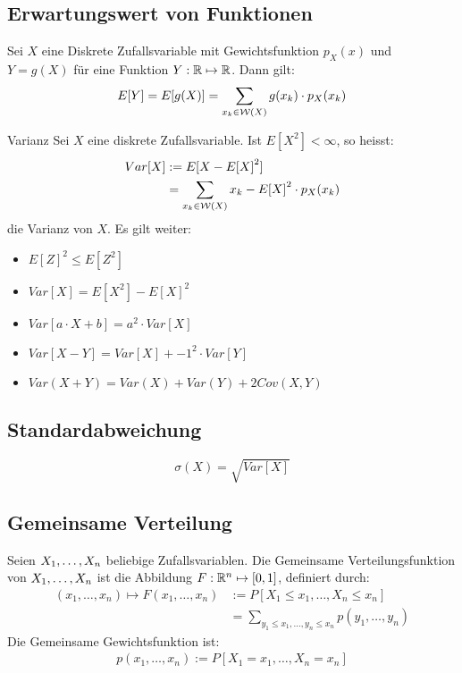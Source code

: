 \subsection{Erwartungswert von Funktionen}
Sei $X$ eine Diskrete Zufallsvariable mit Gewichtsfunktion $p_X (x)$ und $Y = g
  (X)$ für eine Funktion $Y: \mathbb{R} \mapsto \mathbb{R}$. Dann gilt:
\begin{align*}
  E[Y] = E[g (X)] = \sum_{x_k \in \mathcal{W} (X)} g (x_k) \cdot p_X (x_k)
\end{align*}
\begin{definition}{Varianz}
  Sei $X$ eine diskrete Zufallsvariable. Ist $E[X^2] < \infty$, so heisst:
  \begin{align*}
    Var[X] & := E[ {X - E[X]}^2]                                     \\
           & = \sum_{x_k \in \mathcal{W} (X)}  {x_k - E[X]}^2 \cdot p_X (x_k)
  \end{align*}
  die Varianz von $X$. Es gilt weiter:
  \begin{itemize}
    \item $E[Z]^2 \leq E[Z^2]$
    \item $Var[X] = E[X^2] - {E[X]}^2$
    \item $Var[a \cdot X + b] = a^2 \cdot Var[X]$
    \item $Var[X - Y] = Var[X] +  {-1}^2 \cdot Var[Y]$
    \item $Var(X+Y) = Var(X) + Var(Y) + 2Cov(X,Y)$
  \end{itemize}
\end{definition}
\subsection{Standardabweichung}
\[
  \sigma (X) = \sqrt{Var[X]}
\]
\subsection{Gemeinsame Verteilung}
Seien $X_1, \dots, X_n$ beliebige Zufallsvariablen. Die Gemeinsame
Verteilungsfunktion von $X_1, \dots, X_n$ ist die Abbildung $F: \mathbb{R}^n \mapsto
  [0, 1]$, definiert durch:
\begin{align*}
  (x_1, \dots, x_n) \mapsto F (x_1, \dots, x_n) & := P[X_1 \leq x_1, \dots, X_n \leq x_n]                        \\
                                                & = \sum_{y_1 \leq x_1, \dots, y_n \leq x_n} p (y_1, \dots, y_n)
\end{align*}
Die Gemeinsame Gewichtsfunktion ist:
\begin{align*}
  p (x_1, \dots, x_n) := P[X_1 = x_1, \dots, X_n = x_n]
\end{align*}

